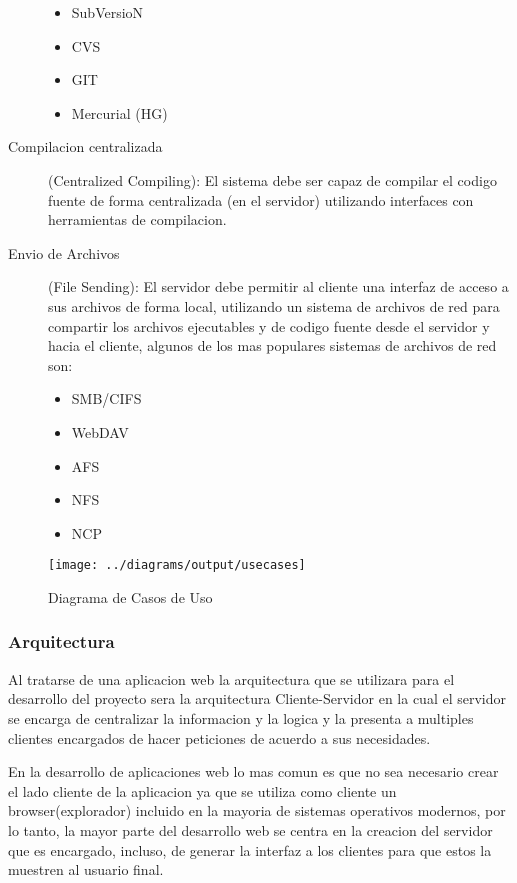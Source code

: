 \begin{description}
	\begin{itemize}
		\item SubVersioN
		\item CVS
		\item GIT
		\item Mercurial (HG)
	\end{itemize}
	
	\item [Compilacion centralizada] (Centralized Compiling): \newline
	El sistema debe ser capaz de compilar el codigo fuente de forma centralizada (en el servidor) utilizando interfaces con herramientas de compilacion.
	
	\item [Envio de Archivos] (File Sending): \newline
	El servidor debe permitir al cliente una interfaz de acceso a sus archivos de forma local, utilizando un sistema de archivos de red para compartir los archivos ejecutables y de codigo fuente desde el servidor y hacia el cliente, algunos de los mas populares sistemas de archivos de red son:
	
	\begin{itemize}
		\item SMB/CIFS
		\item WebDAV
		\item AFS
		\item NFS
		\item NCP
	\end{itemize}
	
\end{description}

\begin{figure}
 \centering
 \texttt{[image: ../diagrams/output/usecases]}
 \caption{Diagrama de Casos de Uso}
 \label{diagrama:casos_uso}
\end{figure}


\subsubsection{Arquitectura}

Al tratarse de una aplicacion web la arquitectura que se utilizara para el desarrollo del proyecto sera la arquitectura Cliente-Servidor en la cual el servidor se encarga de centralizar la informacion y la logica y la presenta a multiples clientes encargados de hacer peticiones de acuerdo a sus necesidades.

En la desarrollo de aplicaciones web lo mas comun es que no sea necesario crear el lado cliente de la aplicacion ya que se utiliza como cliente un browser(explorador) incluido en la mayoria de sistemas operativos modernos, por lo tanto, la mayor parte del desarrollo web se centra en la creacion del servidor que es encargado, incluso, de generar la interfaz a los clientes para que estos la muestren al usuario final.

